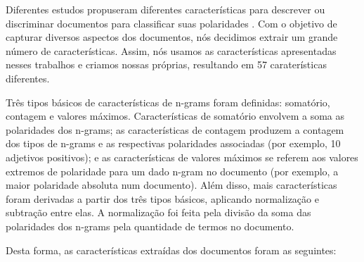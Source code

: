 \documentclass[template.tex]{subfiles}
\begin{document}
Diferentes estudos propuseram diferentes características para descrever ou discriminar documentos para classificar suas polaridades \cite{wilson2005recognizing, ohana2009sentiment, taboada2011lexicon}. Com o objetivo de capturar diversos aspectos dos documentos, nós decidimos extrair um grande número de características. Assim, nós usamos as características apresentadas nesses trabalhos e criamos nossas próprias, resultando em 57 caraterísticas diferentes.

Três tipos básicos de características de n-grams foram definidas: somatório, contagem e valores máximos. Características de somatório envolvem a soma as polaridades dos n-grams; as características de contagem produzem a contagem dos tipos de n-grams e as respectivas polaridades associadas (por exemplo, 10 adjetivos positivos); e as características de valores máximos se referem aos valores extremos de polaridade para um dado n-gram no documento (por exemplo, a maior polaridade absoluta num documento). Além disso, mais características foram derivadas a partir dos três tipos básicos, aplicando normalização e subtração entre elas. A normalização foi feita pela divisão da soma das polaridades dos n-grams pela quantidade de termos no documento.

Desta forma, as características extraídas dos documentos foram as seguintes:
\end{document}
